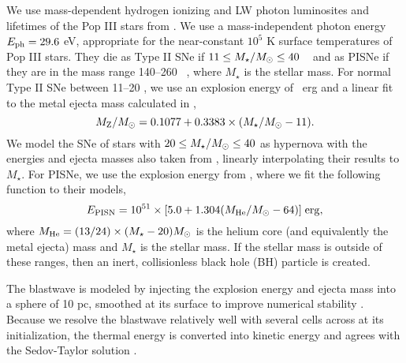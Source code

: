 \documentclass[apjl]{emulateapj}
\begin{document}
We use mass-dependent hydrogen ionizing and LW photon luminosites and
lifetimes of the Pop III stars from \citet{Schaerer02}.  We use a
mass-independent photon energy $E_{\rm ph} = 29.6$ eV, appropriate for
the near-constant $10^5$ K surface temperatures of Pop III stars.
They die as Type II SNe if $11 \le M_\star/\Ms \le 40$
\Ms~\citep{Woosley95} and as PISNe if they are in the mass range
140--260 \Ms~\citep{Heger03}, where $M_\star$ is the stellar mass.
For normal Type II SNe between 11--20 \Ms, we use an explosion energy
of ~erg and a linear fit to the metal ejecta mass calculated
in \citet{Nomoto06},
%
\begin{equation}
  \label{eqn:typeii}
  M_{\rm Z}/\Ms = 0.1077 + 0.3383 \times (M_\star/\Ms - 11).
\end{equation}
%
We model the SNe of stars with $20 \le M_\star/\Ms \le 40$ as
hypernova with the energies and ejecta masses also taken from
\citeauthor{Nomoto06}, linearly interpolating their results to
$M_\star$.  For PISNe, we use the explosion energy from
\citet{Heger02}, where we fit the following function to their models,
%
\begin{equation}
  \label{eqn:pisn}
  E_{\rm PISN} = 10^{51} \times [5.0 + 1.304 (M_{\rm He}/\Ms - 64)] \; \mathrm{erg},
\end{equation}
%
where $M_{\rm He} = (13/24) \times (M_\star - 20) \Ms$ is the helium
core (and equivalently the metal ejecta) mass and $M_\star$ is the
stellar mass.  If the stellar mass is outside of these ranges, then an
inert, collisionless black hole (BH) particle is created.

The blastwave is modeled by injecting the explosion energy and ejecta
mass into a sphere of 10 pc, smoothed at its surface to improve
numerical stability \citep{Wise08_Gal}.  Because we resolve the
blastwave relatively well with several cells across at its
initialization, the thermal energy is converted into kinetic energy
and agrees with the Sedov-Taylor solution \citep[e.g.][]{Greif07}.
\end{document}
